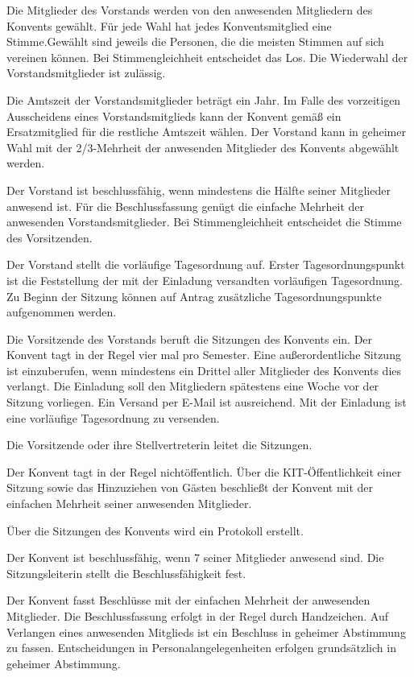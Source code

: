 \documentclass[a4paper, parskip=half, numbers=noenddot]{scrartcl}
\begin{document}
\begin{contract}
\label{wahl}
Die Mitglieder des Vorstands werden von den anwesenden Mitgliedern des Konvents gewählt. Für jede Wahl hat jedes Konventsmitglied eine Stimme.Gewählt sind jeweils die Personen, die die meisten Stimmen auf sich vereinen können. Bei Stimmengleichheit entscheidet das Los. Die Wiederwahl der Vorstandsmitglieder ist zulässig.

Die Amtszeit der Vorstandsmitglieder beträgt ein Jahr. Im Falle des vorzeitigen Ausscheidens
eines Vorstandsmitglieds kann der Konvent gemäß  ein Ersatzmitglied für die restliche Amtszeit wählen. Der Vorstand kann in geheimer Wahl mit der 2/3-Mehrheit der anwesenden Mitglieder des Konvents abgewählt werden.

Der Vorstand ist beschlussfähig, wenn mindestens die Hälfte seiner Mitglieder anwesend ist. Für die Beschlussfassung genügt die einfache Mehrheit der anwesenden Vorstandsmitglieder. Bei Stimmengleichheit entscheidet die Stimme des Vorsitzenden.


Der Vorstand stellt die vorläufige Tagesordnung auf. Erster Tagesordnungspunkt ist die Feststellung der mit der Einladung versandten vorläufigen Tagesordnung. Zu Beginn der Sitzung können auf Antrag zusätzliche Tagesordnungspunkte aufgenommen werden.

Die Vorsitzende des Vorstands beruft die Sitzungen des Konvents ein.
Der Konvent tagt in der Regel vier mal pro Semester. Eine außerordentliche Sitzung ist einzuberufen, wenn mindestens ein Drittel aller Mitglieder des Konvents dies verlangt. Die Einladung soll den Mitgliedern spätestens eine Woche vor der Sitzung vorliegen. Ein Versand per E-Mail ist ausreichend. Mit der Einladung ist eine vorläufige Tagesordnung zu versenden.

Die Vorsitzende oder ihre Stellvertreterin leitet die Sitzungen.	

Der Konvent tagt in der Regel nichtöffentlich. Über die KIT-Öffentlichkeit einer Sitzung sowie das Hinzuziehen von Gästen beschließt der Konvent mit der einfachen Mehrheit seiner anwesenden Mitglieder.

Über die Sitzungen des Konvents wird ein Protokoll erstellt.

Der Konvent ist beschlussfähig, wenn 7 seiner Mitglieder anwesend sind. Die Sitzungsleiterin stellt die Beschlussfähigkeit fest.

Der Konvent fasst Beschlüsse mit der einfachen Mehrheit der anwesenden Mitglieder. Die Beschlussfassung erfolgt in der Regel durch Handzeichen. Auf Verlangen eines anwesenden Mitglieds ist ein Beschluss in geheimer Abstimmung zu fassen. Entscheidungen in Personalangelegenheiten erfolgen grundsätzlich in geheimer Abstimmung.



\end{contract}
\end{document}

